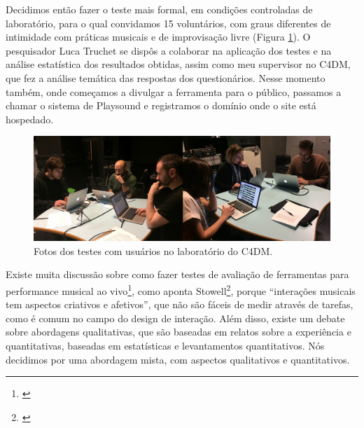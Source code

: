 Decidimos então fazer o teste mais formal, em condições controladas de laboratório, para o qual convidamos 15 voluntários, com graus diferentes de intimidade com práticas musicais e de improvisação livre (Figura \ref{usertest}). O pesquisador Luca Truchet se dispôs a colaborar na aplicação dos testes e na análise estatística dos resultados obtidas, assim como meu supervisor no C4DM, que fez a análise temática das respostas dos questionários. Nesse momento também, onde começamos a divulgar a ferramenta para o público, passamos a chamar o sistema de Playsound e registramos o domínio onde o site está hospedado.


\begin{figure}

\includegraphics[width=1\textwidth]{pictures/cap4/usertest}
\caption{\label{usertest}Fotos dos testes com usuários no laboratório do C4DM.}
\end{figure}


Existe muita discussão sobre como fazer testes de avaliação de ferramentas para performance musical ao vivo\footnote{\cite{Barbosa2015}}, como aponta Stowell\footnote{\cite{Stowell}}, porque ``interações musicais tem aspectos criativos e afetivos'', que não são fáceis de medir através de tarefas, como é comum no campo do design de interação. Além disso, existe um debate sobre abordagens qualitativas, que são baseadas em relatos sobre a experiência e quantitativas, baseadas em estatísticas e levantamentos quantitativos. Nós decidimos por uma abordagem mista, com aspectos qualitativos e quantitativos.

